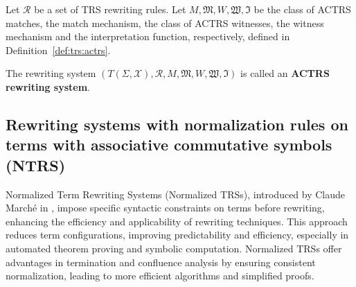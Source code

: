 \begin{definition}
  Let $\mathcal{R}$ be a set of TRS rewriting rules. 
  Let $M, \mathfrak{M}, W, \mathfrak{W}, \mathfrak{I}$ be the class of ACTRS matches, the match mechanism, the class of ACTRS witnesses, the witness mechanism and the interpretation function, respectively, defined in Definition~\ref{def:trs:actrs}.

  The rewriting system $(T(\Sigma,\mathcal{X}), \mathcal{R}, M, \mathfrak{M}, W, \mathfrak{W}, \mathfrak{I})$ is called an \textbf{ACTRS rewriting system}.
\end{definition}



\subsection{Rewriting systems with normalization rules on terms with associative commutative symbols (NTRS)}

Normalized Term Rewriting Systems (Normalized TRSs), introduced by Claude Marché in \cite{marche1996normalized}, impose specific syntactic constraints on terms before rewriting, enhancing the efficiency and applicability of rewriting techniques. This approach reduces term configurations, improving predictability and efficiency, especially in automated theorem proving and symbolic computation. Normalized TRSs offer advantages in termination and confluence analysis by ensuring consistent normalization, leading to more efficient algorithms and simplified proofs. 


